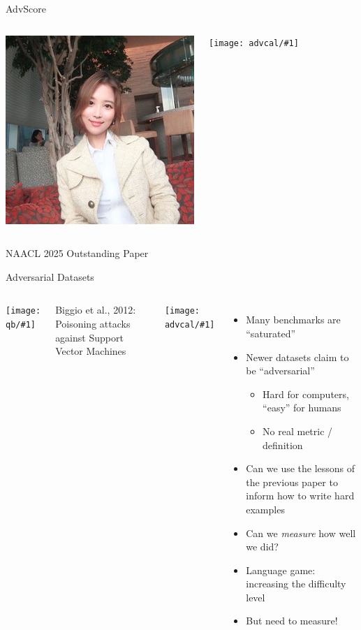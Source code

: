 \documentclass[compress]{beamer}
\newcommand{\gfxq}[2]{
\begin{center}
	\texttt{[image: qb/\#1]}
\end{center}
}
\newcommand{\gfxa}[2]{
	\begin{center}
		\texttt{[image: advcal/\#1]}
	\end{center}
}
\begin{document}
\begin{frame}{AdvScore}
	\begin{columns}
		
		\includegraphics[width=1.0\linewidth]{general_figures/yooyeon}
		\gfxa{advscore_paper}{1.0}
	\end{columns}
	\centering
	NAACL 2025 Outstanding Paper
\end{frame}


\begin{frame}{Adversarial Datasets}
	
	\begin{columns}
		\column{.5\linewidth}
		\gfxq{benchmark_saturation}{0.75}
		Biggio et al., 2012: Poisoning attacks against Support Vector Machines
		
		\gfxa{adversarial_turtle}{.6}
		
		
		\column{.5\linewidth}
		\begin{itemize}
			
			\item Many benchmarks are ``saturated''
			\item Newer datasets claim to be ``adversarial''
			\begin{itemize}
				\item Hard for computers, ``easy'' for humans
				\item No real metric / definition
			\end{itemize}
			\item Can we use the lessons of the previous paper to inform how to write hard examples
			\item Can we \emph{measure} how well we did?
			\pause
			\item Language game: increasing the difficulty level
			\item But need to measure!
		\end{itemize}
	\end{columns}
\end{frame}
\end{document}
